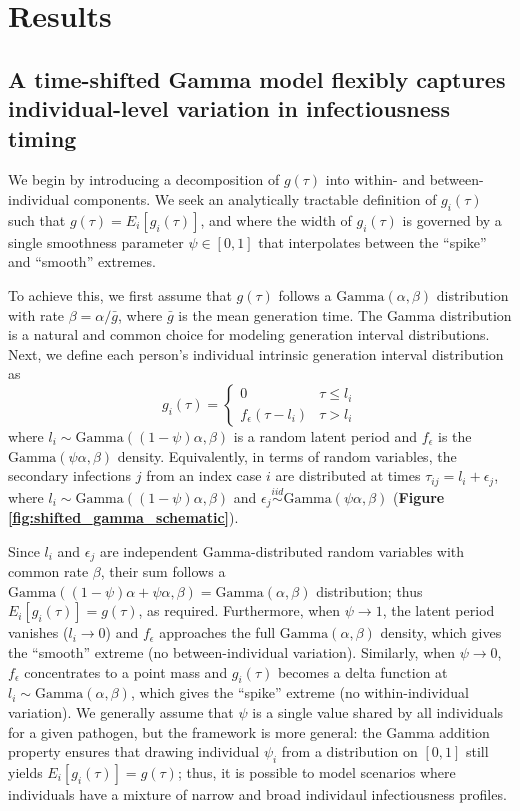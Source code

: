 \section{Results}

\subsection{A time-shifted Gamma model flexibly captures individual-level variation in infectiousness timing}
\label{sec:results_time-shifted-gamma}

We begin by introducing a decomposition of $g(\tau)$ into within- and between-individual components. We seek an analytically tractable definition of $g_i(\tau)$ such that $g(\tau) = E_i[g_i(\tau)]$, and where the width of $g_i(\tau)$ is governed by a single smoothness parameter $\psi \in [0,1]$ that interpolates between the ``spike'' and ``smooth'' extremes. 

To achieve this, we first assume that $g(\tau)$ follows a $\text{Gamma}(\alpha, \beta)$ distribution with rate $\beta = \alpha  / \bar{g}$, where $\bar{g}$ is the mean generation time. The Gamma distribution is a natural and common choice for modeling generation interval distributions. Next, we define each person's individual intrinsic generation interval distribution as 
%
\begin{equation}
	g_i(\tau) = \begin{cases}
		0 & \tau \leq l_i \\ 
		f_\epsilon(\tau - l_i) & \tau > l_i
	\end{cases}
\end{equation} 
%
where $l_i \sim \text{Gamma}((1-\psi)\alpha, \beta)$ is a random latent period and $f_\epsilon$ is the $\text{Gamma}(\psi \alpha, \beta)$ density. Equivalently, in terms of random variables, the secondary infections $j$ from an index case $i$ are distributed at times $\tau_{ij} = l_i + \epsilon_j$, where $l_i \sim \text{Gamma}((1-\psi)\alpha, \beta)$ and $\epsilon_j \overset{iid}{\sim} \text{Gamma}(\psi \alpha, \beta)$ ({\bf Figure \ref{fig:shifted_gamma_schematic}}). 
 
Since $l_i$ and $\epsilon_j$ are independent Gamma-distributed random variables with common rate $\beta$, their sum follows a $\text{Gamma}((1-\psi) \alpha + \psi \alpha, \beta) = \text{Gamma}(\alpha, \beta)$ distribution; thus $E_i[g_i(\tau)] = g(\tau)$, as required. Furthermore, when $\psi \rightarrow 1$, the latent period vanishes ($l_i \rightarrow 0$) and $f_\epsilon$ approaches the full $\text{Gamma}(\alpha, \beta)$ density, which gives the ``smooth'' extreme (no between-individual variation). Similarly, when $\psi \rightarrow 0$, $f_\epsilon$ concentrates to a point mass and $g_i(\tau)$ becomes a delta function at $l_i \sim \text{Gamma}(\alpha, \beta)$, which gives the ``spike'' extreme (no within-individual variation). We generally assume that $\psi$ is a single value shared by all individuals for a given pathogen, but the framework is more general: the Gamma addition property ensures that drawing individual $\psi_i$ from a distribution on $[0,1]$ still yields $E_i[g_i(\tau)] = g(\tau)$; thus, it is possible to model scenarios where individuals have a mixture of narrow and broad individaul infectiousness profiles. 

